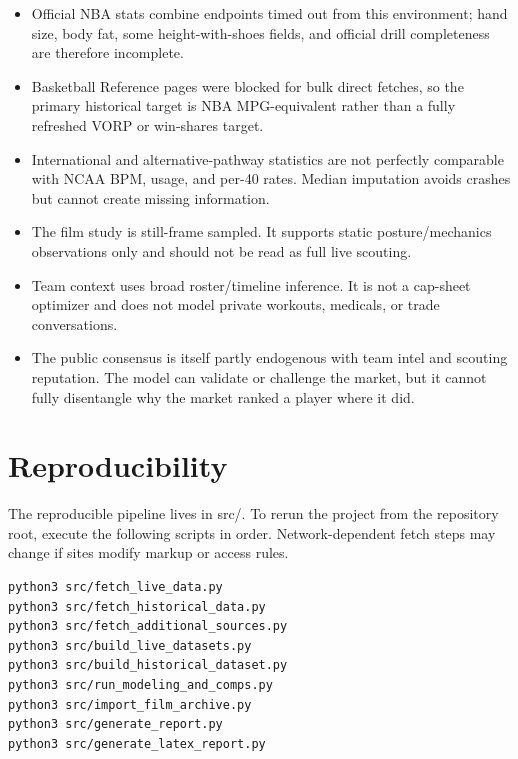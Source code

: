 \documentclass[11pt]{article}
\begin{document}
\begin{itemize}[leftmargin=*]

\item Official NBA stats combine endpoints timed out from this environment; hand size, body fat, some height-with-shoes fields, and official drill completeness are therefore incomplete.

\item Basketball Reference pages were blocked for bulk direct fetches, so the primary historical target is NBA MPG-equivalent rather than a fully refreshed VORP or win-shares target.

\item International and alternative-pathway statistics are not perfectly comparable with NCAA BPM, usage, and per-40 rates. Median imputation avoids crashes but cannot create missing information.

\item The film study is still-frame sampled. It supports static posture/mechanics observations only and should not be read as full live scouting.

\item Team context uses broad roster/timeline inference. It is not a cap-sheet optimizer and does not model private workouts, medicals, or trade conversations.

\item The public consensus is itself partly endogenous with team intel and scouting reputation. The model can validate or challenge the market, but it cannot fully disentangle why the market ranked a player where it did.

\end{itemize}

\section{Reproducibility}

The reproducible pipeline lives in src/. To rerun the project from the repository root, execute the following scripts in order. Network-dependent fetch steps may change if sites modify markup or access rules.

\begin{verbatim}
python3 src/fetch_live_data.py
python3 src/fetch_historical_data.py
python3 src/fetch_additional_sources.py
python3 src/build_live_datasets.py
python3 src/build_historical_dataset.py
python3 src/run_modeling_and_comps.py
python3 src/import_film_archive.py
python3 src/generate_report.py
python3 src/generate_latex_report.py
\end{verbatim}
\end{document}
